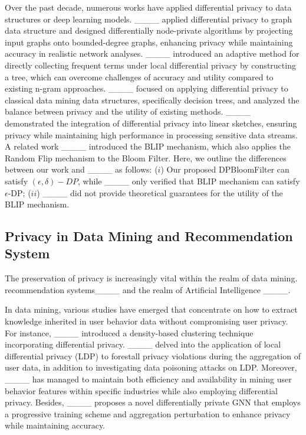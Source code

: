 Over the past decade, numerous works have applied differential privacy to data structures or deep learning models. ____ applied differential privacy to graph data structure and designed differentially node-private algorithms by projecting input graphs onto bounded-degree graphs, enhancing privacy while maintaining accuracy in realistic network analyses. ____ introduced an adaptive method for directly collecting frequent terms under local differential privacy by constructing a tree, which can overcome challenges of accuracy and utility compared to existing n-gram approaches. ____ focused on applying differential privacy to classical data mining data structures, specifically decision trees, and analyzed the balance between privacy and the utility of existing methods. ____ demonstrated the integration of differential privacy into linear sketches, ensuring privacy while maintaining high performance in processing sensitive data streams.
A related work ____ introduced the BLIP mechanism, which also applies the Random Flip mechanism to the Bloom Filter. Here, we outline the differences between our work and ____ as follows:
($i$) Our proposed DPBloomFilter can satisfy $(\epsilon,\delta)-DP$, while ____ only verified that BLIP mechanism can satisfy $\epsilon$-DP; 
($ii$) ____ did not provide theoretical guarantees for the utility of the BLIP mechanism.


\subsection{Privacy in Data Mining and Recommendation System} \label{sec:related_work:data_mining_privacy}


The preservation of privacy is increasingly vital within the realm of data mining. recommendation systems____ and the realm of Artificial Intelligence ____.

In data mining, various studies have emerged that concentrate on how to extract knowledge inherited in user behavior data without compromising user privacy. For instance, ____ introduced a density-based clustering technique incorporating differential privacy. ____ delved into the application of local differential privacy (LDP) to forestall privacy violations during the aggregation of user data, in addition to investigating data poisoning attacks on LDP. 
Moreover, ____ has managed to maintain both efficiency and availability in mining user behavior features within specific industries while also employing differential privacy. Besides, ____ proposes a novel differentially private GNN that employs a progressive training scheme and aggregation perturbation to enhance privacy while maintaining accuracy. 

